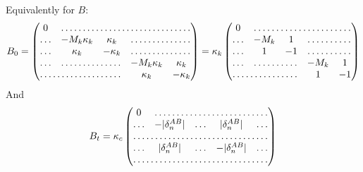\documentclass[a4paper,12pt]{article}
\begin{document}
Equivalently for $B$:
\begin{equation}
  B_0 =%
  \begin{pmatrix}
    \,0\, & \hdotsfor{4}\\
    \hdots &  - M_k \kappa_k & \kappa_k & \hdotsfor{2} \\
    \hdots & \kappa_k & -\kappa_k &  \hdotsfor{2}\\
    \hdots &  \hdotsfor{2} & - M_k \kappa_k & \kappa_k \\
    \hdotsfor{3}  & \kappa_k & - \kappa_k\\
  \end{pmatrix}
  =\kappa_k%
  \begin{pmatrix}
    \,0\, & \hdotsfor{4}\\
    \hdots &  - M_k  & 1 & \hdotsfor{2} \\
    \hdots & 1 & -1 &  \hdotsfor{2}\\
    \hdots &  \hdotsfor{2} & - M_k  & 1 \\
    \hdotsfor{3}  & 1 & - 1\\
  \end{pmatrix}
\end{equation}
And
\begin{equation}
  B_t =\kappa_c%
  \begin{pmatrix}
    \,0\, & \hdotsfor{4}\\
    \hdots & - |\delta_n^{AB}| & \hdots & |\delta_n^{AB}| & \hdots \\
    \hdotsfor{5}\\
    \hdots & |\delta_n^{AB}| & \hdots & -|\delta_n^{AB}|& \hdots \\
    \hdotsfor{5}\\
  \end{pmatrix}
\end{equation}


\end{document}
